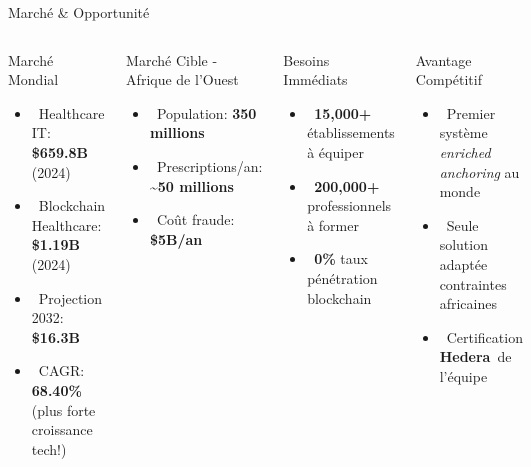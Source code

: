 \documentclass[aspectratio=169,11pt]{beamer}
\newcommand{\hedera}{\textbf{Hedera}\texttrademark}
\begin{document}
\begin{frame}{Marché \& Opportunité}

\begin{columns}[T]
\begin{block}{Marché Mondial}
\begin{itemize}
    \item \faGlobe~Healthcare IT: \textbf{\$659.8B} (2024)
    \item \faLink~Blockchain Healthcare: \textbf{\$1.19B} (2024)
    \item \faArrowUp~Projection 2032: \textbf{\$16.3B}
    \item \faChartLine~CAGR: \textbf{68.40\%} (plus forte croissance tech!)
\end{itemize}
\end{block}

\vspace{0.3cm}

\begin{alertblock}{Marché Cible - Afrique de l'Ouest}
\begin{itemize}
    \item \faUsers~Population: \textbf{350 millions}
    \item \faPills~Prescriptions/an: \textbf{\textasciitilde50 millions}
    \item \faExclamationTriangle~Coût fraude: \textbf{\$5B/an}
\end{itemize}
\end{alertblock}

\begin{exampleblock}{Besoins Immédiats}
\begin{itemize}
    \item \faHospital~\textbf{15,000+} établissements à équiper
    \item \faUserMd~\textbf{200,000+} professionnels à former
    \item \faPercentage~\textbf{0\%} taux pénétration blockchain
\end{itemize}
\end{exampleblock}

\vspace{0.3cm}

\begin{block}{Avantage Compétitif}
\small
\begin{itemize}
    \item \faTrophy~Premier système \textit{enriched anchoring} au monde
    \item \faCheckDouble~Seule solution adaptée contraintes africaines
    \item \faCertificate~Certification \hedera~de l'équipe
\end{itemize}
\end{block}
\end{columns}

\end{frame}
\end{document}
